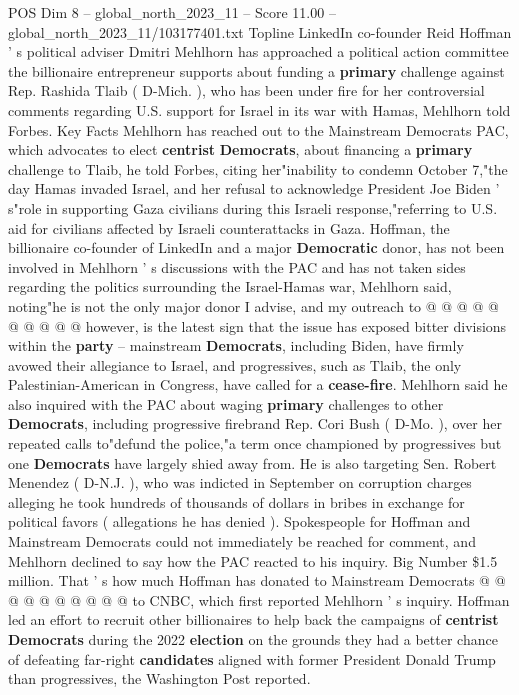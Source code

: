 \begin{textsample}{POS Dim 8 – global\_north\_2023\_11 – Score 11.00 – global\_north\_2023\_11/103177401.txt}  \label{ex:f8_pos_125}
Topline LinkedIn co-founder Reid Hoffman ' s political adviser Dmitri Mehlhorn has approached a political action committee the billionaire entrepreneur supports about funding a \textbf{primary} challenge against Rep.
Rashida Tlaib ( D-Mich. ), who has been under fire for her controversial comments regarding U.S. support for Israel in its war with Hamas, Mehlhorn told Forbes.
Key Facts Mehlhorn has reached out to the Mainstream Democrats PAC, which advocates to elect \textbf{centrist} \textbf{Democrats}, about financing a \textbf{primary} challenge to Tlaib, he told Forbes, citing her"inability to condemn October 7,"the day Hamas invaded Israel, and her refusal to acknowledge President Joe Biden ' s"role in supporting Gaza civilians during this Israeli response,"referring to U.S. aid for civilians affected by Israeli counterattacks in Gaza.
Hoffman, the billionaire co-founder of LinkedIn and a major \textbf{Democratic} donor, has not been involved in Mehlhorn ' s discussions with the PAC and has not taken sides regarding the politics surrounding the Israel-Hamas war, Mehlhorn said, noting"he is not the only major donor I advise, and my outreach to @ @ @ @ @ @ @ @ @ @ however, is the latest sign that the issue has exposed bitter divisions within the \textbf{party} -- mainstream \textbf{Democrats}, including Biden, have firmly avowed their allegiance to Israel, and progressives, such as Tlaib, the only Palestinian-American in Congress, have called for a \textbf{cease-fire}.
Mehlhorn said he also inquired with the PAC about waging \textbf{primary} challenges to other \textbf{Democrats}, including progressive firebrand Rep.
Cori Bush ( D-Mo. ), over her repeated calls to"defund the police,"a term once championed by progressives but one \textbf{Democrats} have largely shied away from.
He is also targeting Sen.
Robert Menendez ( D-N.J. ), who was indicted in September on corruption charges alleging he took hundreds of thousands of dollars in bribes in exchange for political favors ( allegations he has denied ).
Spokespeople for Hoffman and Mainstream Democrats could not immediately be reached for comment, and Mehlhorn declined to say how the PAC reacted to his inquiry.
Big Number \$1.5 million.
That ' s how much Hoffman has donated to Mainstream Democrats @ @ @ @ @ @ @ @ @ @ to CNBC, which first reported Mehlhorn ' s inquiry.
Hoffman led an effort to recruit other billionaires to help back the campaigns of \textbf{centrist} \textbf{Democrats} during the 2022 \textbf{election} on the grounds they had a better chance of defeating far-right \textbf{candidates} aligned with former President Donald Trump than progressives, the Washington Post reported.

\end{textsample}
